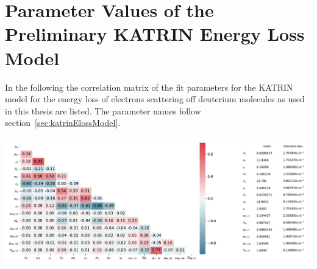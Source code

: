 \section{Parameter Values of the Preliminary KATRIN Energy Loss Model}
\label{sec:appendixKatrinElossElossModelParams}
In the following the correlation matrix of the fit parameters for the KATRIN model for the energy loss of electrons scattering off deuterium molecules as used in this thesis are listed. The parameter names follow section~\ref{sec:katrinElossModel}.

\includegraphics[width=\textwidth]{chapter/sensitivityStudyWithPreliminaryKatrinElossModel/appendix/fig/katrinElossParamValues.pdf}